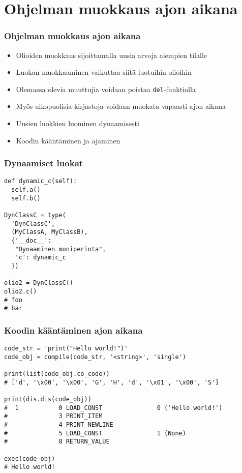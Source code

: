 \documentclass{beamer}
\begin{document}
\section{Ohjelman muokkaus ajon aikana}


\begin{frame}[fragile]
\frametitle{Ohjelman muokkaus ajon aikana}
\begin{itemize}
\item{Olioiden muokkaus sijoittamalla uusia arvoja aiempien tilalle}
\item{Luokan muokkaaminen vaikuttaa siitä luotuihin olioihin}
\item{Olemassa olevia muuttujia voidaan poistaa \verb|del|-funktiolla}
\item{Myös ulkopuolisia kirjastoja voidaan muokata vapaasti ajon aikana}
\item{Uusien luokkien luominen dynaamisesti}
\item{Koodin kääntäminen ja ajaminen}
\end{itemize}
\end{frame}


\begin{frame}[fragile]
\frametitle{Dynaamiset luokat}
\begin{verbatim}
def dynamic_c(self):
  self.a()
  self.b()

DynClassC = type(
  'DynClassC', 
  (MyClassA, MyClassB), 
  {'__doc__': 
   "Dynaaminen moniperinta", 
   'c': dynamic_c
  })

olio2 = DynClassC()
olio2.c()
# foo    
# bar
\end{verbatim}
\end{frame}



\begin{frame}[fragile]
\frametitle{Koodin kääntäminen ajon aikana}
\begin{verbatim}
code_str = 'print("Hello world!")'
code_obj = compile(code_str, '<string>', 'single')

print(list(code_obj.co_code))
# ['d', '\x00', '\x00', 'G', 'H', 'd', '\x01', '\x00', 'S']

print(dis.dis(code_obj))
#  1           0 LOAD_CONST               0 ('Hello world!')
#              3 PRINT_ITEM          
#              4 PRINT_NEWLINE       
#              5 LOAD_CONST               1 (None)
#              8 RETURN_VALUE        

exec(code_obj)
# Hello world!
\end{verbatim}
\end{frame}
\end{document}
